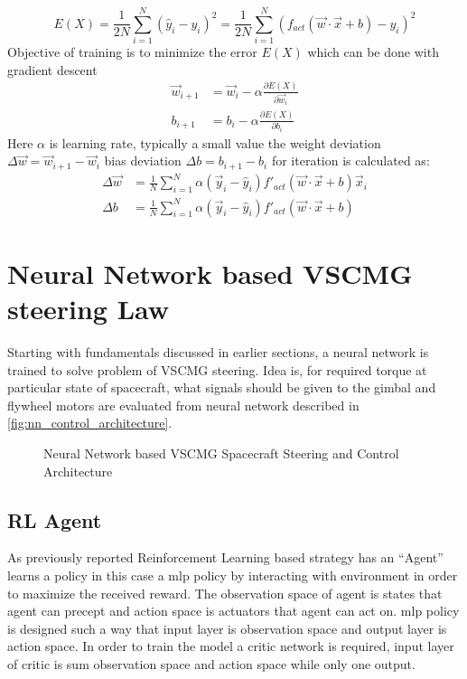 \begin{equation}
E( X) =\frac{1}{2N}\sum ^{N}_{i=1}(\hat{y}_{i} -y_{i})^{2} =\frac{1}{2N}\sum ^{N}_{i=1}( f_{act}(\vec{w} \cdotp \vec{x} +b) -y_{i})^{2}
\end{equation}Objective of training is to minimize the error $\displaystyle E( X)$ which can be done with gradient descent
\begin{equation}
\begin{aligned}
\vec{w}_{i+1} & =\vec{w}_{i} -\alpha \frac{\partial E( X)}{\partial \vec{w}_{i}}\\
b_{i+1} & =b_{i} -\alpha \frac{\partial E( X)}{\partial b_{i}}
\end{aligned}
\end{equation}
Here $\displaystyle \alpha $ is learning rate, typically a small value the weight deviation $\displaystyle \Delta \vec{w} =\vec{w}_{i+1} -\vec{w}_{i}$ bias deviation $\displaystyle \Delta b=b_{i+1} -b_{i}$ for iteration is calculated as:
\begin{equation}
\begin{aligned}
\Delta \vec{w} & =\frac{1}{N}\sum ^{N}_{i=1} \alpha (\vec{y}_{i} -\hat{y}_{i}) f'_{act}(\vec{w} \cdotp \vec{x} +b)\vec{x}_{i}\\
\Delta b & =\frac{1}{N}\sum ^{N}_{i=1} \alpha (\vec{y}_{i} -\hat{y}_{i}) f'_{act}(\vec{w} \cdotp \vec{x} +b)
\end{aligned}
\end{equation}
\section{Neural Network based VSCMG steering Law}
Starting with fundamentals discussed in earlier sections, a neural network is trained to solve problem of VSCMG steering. Idea is, for required torque at particular state of spacecraft, what signals should be given to the gimbal and flywheel motors are evaluated from neural network described in \autoref{fig:nn_control_architecture}. 

\begin{figure}[H]
    \centering
    
    \caption{Neural Network based VSCMG Spacecraft Steering and Control Architecture}
    \label{fig:nn_control_architecture}
\end{figure}
\subsection{RL Agent}
As previously reported Reinforcement Learning based strategy has an ``Agent'' learns a policy in this case a \acrshort{mlp} policy by interacting with environment in order to maximize the received reward. The observation space of agent is states that agent can precept and action space is actuators that agent can act on. \acrshort{mlp} policy is designed such a way that input layer is observation space and output layer is action space. In order to train the model a critic network is required, input layer of critic is sum observation space and action space while only one output.
